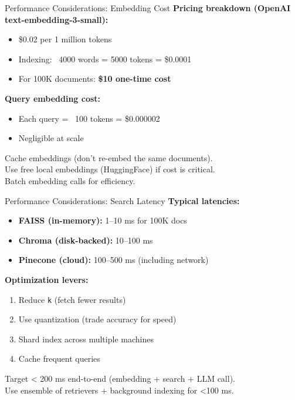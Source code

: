 \documentclass[aspectratio=169,11pt]{beamer}
\begin{document}
\begin{frame}{Performance Considerations: Embedding Cost}
  \textbf{Pricing breakdown (OpenAI text-embedding-3-small):}
  \begin{itemize}
    \setlength{\itemsep}{1pt}
    \item \$0.02 per 1 million tokens
    \item Indexing: ~4000 words = 5000 tokens = \$0.0001
    \item For 100K documents: \textbf{\$10 one-time cost}
  \end{itemize}

  \vspace{0.05cm}
  \textbf{Query embedding cost:}
  \begin{itemize}
    \setlength{\itemsep}{1pt}
    \item Each query = ~100 tokens = \$0.000002
    \item Negligible at scale
  \end{itemize}

  \vspace{0.05cm}
  \begin{warningbox}
    Cache embeddings (don't re-embed the same documents).\\
    Use free local embeddings (HuggingFace) if cost is critical.\\
    Batch embedding calls for efficiency.
  \end{warningbox}
\end{frame}

\begin{frame}{Performance Considerations: Search Latency}
  \textbf{Typical latencies:}
  \begin{itemize}
    \setlength{\itemsep}{1pt}
    \item \textbf{FAISS (in-memory):} 1--10 ms for 100K docs
    \item \textbf{Chroma (disk-backed):} 10--100 ms
    \item \textbf{Pinecone (cloud):} 100--500 ms (including network)
  \end{itemize}

  \vspace{0.05cm}
  \textbf{Optimization levers:}
  \begin{enumerate}
    \setlength{\itemsep}{0pt}
    \item Reduce \texttt{k} (fetch fewer results)
    \item Use quantization (trade accuracy for speed)
    \item Shard index across multiple machines
    \item Cache frequent queries
  \end{enumerate}

  \vspace{0.05cm}
  \begin{tipbox}
    Target < 200 ms end-to-end (embedding + search + LLM call).\\
    Use ensemble of retrievers + background indexing for <100 ms.
  \end{tipbox}
\end{frame}
\end{document}
